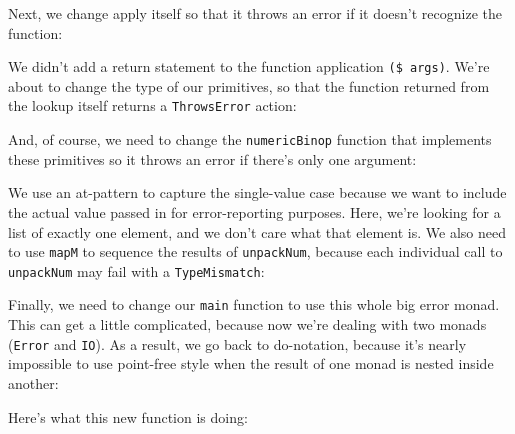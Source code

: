Next, we change apply itself so that it throws an error if it doesn't recognize the function:
 
 
We didn't add a return statement to the function application \verb|($ args)|. We're about to change the type of our primitives, so that the function returned from the lookup itself returns a \verb|ThrowsError| action:
 
 
And, of course, we need to change the \verb|numericBinop| function that implements these primitives so it throws an error if there's only one argument:
 
 
We use an at-pattern to capture the single-value case because we want to include the actual value passed in for error-reporting purposes. Here, we're looking for a list of exactly one element, and we don't care what that element is. We also need to use \verb|mapM| to sequence the results of \verb|unpackNum|, because each individual call to \verb|unpackNum| may fail with a \verb|TypeMismatch|:
 
 
Finally, we need to change our \verb|main| function to use this whole big error monad. This can get a little complicated, because now we're dealing with two monads (\verb|Error| and \verb|IO|). As a result, we go back to do-notation, because it's nearly impossible to use point-free style when the result of one monad is nested inside another:
 
 
Here's what this new function is doing:
 
